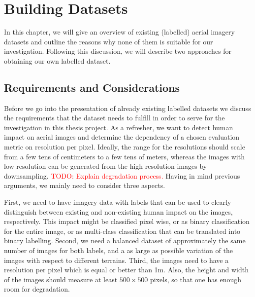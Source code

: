 
\chapter{Building Datasets} %

\label{Chapter2} %


\newcommand{\keyword}[1]{\textbf{#1}}
\newcommand{\tabhead}[1]{\textbf{#1}}
\newcommand{\code}[1]{\texttt{#1}}
\newcommand{\file}[1]{\texttt{\bfseries#1}}
\newcommand{\option}[1]{\texttt{\itshape#1}}

In this chapter, we will give an overview of existing (labelled) aerial imagery datasets and outline the reasons why none of them is suitable for our investigation. Following this discussion, we will describe two approaches for obtaining our own labelled dataset.

\section{Requirements and Considerations}

Before we go into the presentation of already existing labelled datasets we discuss the requirements that the dataset needs to fulfill in order to serve for the investigation in this thesis project. As a refresher, we want to detect human impact on aerial images and determine the dependency of a chosen evaluation metric on resolution per pixel. Ideally, the range for the resolutions should scale from a few tens of centimeters to a few tens of meters, whereas the images with low resolution can be generated from the high resolution images by downsampling. \textcolor{red}{TODO: Explain degradation process.} Having in mind previous arguments, we mainly need to consider three aspects. 

First, we need to have imagery data with labels that can be used to clearly distinguish between existing and non-existing human impact on the images, respectively. This impact might be classified pixel wise, or as binary classification for the entire image, or as multi-class classification that can be translated into binary labelling. Second, 
we need a balanced dataset of approximately the same number of images for both labels, and a as large as possible variation of the images with respect to different terrains. Third, the images need to have a resolution per pixel which is equal or better than 1m. Also, the height and width of the images should measure at least $500\times500$ pixels, so that one has enough room for degradation. 

